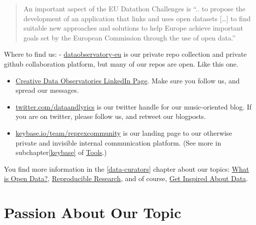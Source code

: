 \documentclass[
  a4paper,
  openany, a4paper, oneside]{book}
\begin{document}
\begin{quote}
An important aspect of the EU Datathon Challenges is ``.. to propose the development of an application that links and uses open datasets {[}\ldots{]} to find suitable new approaches and solutions to help Europe achieve important goals set by the European Commission through the use of open data.''
\end{quote}

Where to find us:
- \href{https://github.com/dataobservatory-eu}{dataobservatory-eu} is our private repo collection and private github collaboration platform, but many of our repos are open. Like this one.

\begin{itemize}
\item
  \href{https://www.linkedin.com/company/reprexbv/}{Creative Data Observatories LinkedIn Page}. Make sure you follow us, and spread our messages.
\item
  \href{https://twitter.com/dataandlyrics}{twitter.com/dataandlyrics} is our twitter handle for our music-oriented blog. If you are on twitter, please follow us, and retweet our blogposts.
\item
  \href{https://keybase.io/team/reprexcommunity}{keybase.io/team/reprexcommunity} is our landing page to our otherwise private and invisible internal communication platform. (See more in subchapter\ref{keybase} of \protect\hyperlink{keybase}{Tools}.)
\end{itemize}

You find more information in the \ref{data-curators} chapter about our topics: \protect\hyperlink{open-data}{What is Open Data?}, \protect\hyperlink{reproducible-research-theory}{Reproducible Research}, and of course, \protect\hyperlink{get-inspired}{Get Inspired About Data}.

\hypertarget{topic-associate}{%
\section{Passion About Our Topic}\label{topic-associate}}
\end{document}
